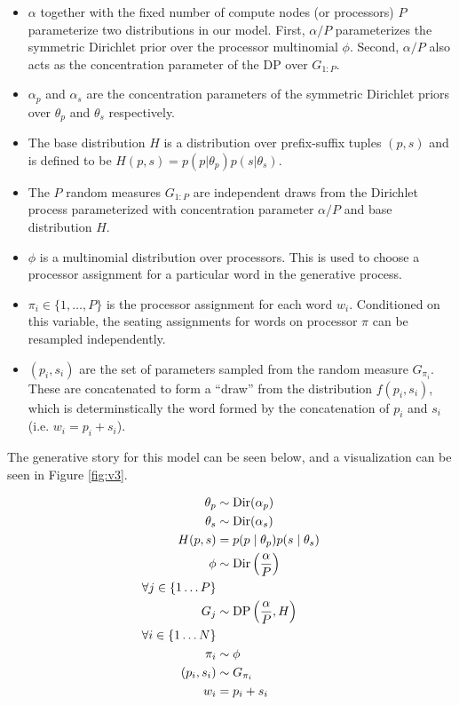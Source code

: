 \begin{itemize}

\item $\alpha$ together with the fixed number of compute nodes (or
  processors) $P$ parameterize two distributions in our model. First,
  $\alpha/P$ parameterizes the symmetric Dirichlet prior over the
  processor multinomial $\phi$. Second, $\alpha/P$ also acts as the
  concentration parameter of the DP over $G_{1:P}$.

\item $\alpha_p$ and $\alpha_s$ are the concentration parameters of
  the symmetric Dirichlet priors over $\theta_p$ and $\theta_s$
  respectively.

\item The base distribution $H$ is a distribution over prefix-suffix
  tuples $(p, s)$ and is defined to be $H(p, s) = p(p | \theta_p) p(s
  | \theta_s)$.

\item The $P$ random measures $G_{1:P}$ are independent draws from the
  Dirichlet process parameterized with concentration parameter
  $\alpha/P$ and base distribution $H$.

\item $\phi$ is a multinomial distribution over processors. This is
  used to choose a processor assignment for a particular word in the
  generative process.

\item $\pi_i \in \{1, \ldots, P\}$ is the processor assignment for
  each word $w_i$. Conditioned on this variable, the seating
  assignments for words on processor $\pi$ can be resampled
  independently.

\item $(p_i, s_i)$ are the set of parameters sampled from the random
  measure $G_{\pi_i}$. These are concatenated to form a ``draw'' from
  the distribution $f(p_i, s_i)$, which is determinstically the word
  formed by the concatenation of $p_i$ and $s_i$ (i.e. $w_i = p_i +
  s_i$).

\end{itemize}

The generative story for this model can be seen below, and a
visualization can be seen in Figure \ref{fig:v3}.

\begin{align*}
  \theta_p & \sim \mathrm{Dir}(\alpha_p) \\
  \theta_s & \sim \mathrm{Dir}(\alpha_s) \\
  H(p, s) & = p(p \mid \theta_p) p(s \mid \theta_s) \\
  \phi & \sim \mathrm{Dir}\left(\frac{\alpha}{P}\right) \\
  \forall j \in \{1 \dots P\} \\
  G_j & \sim \mathrm{DP}\left(\frac{\alpha}{P}, H\right)\\
  \forall i \in \{1 \dots N\} \\
  \pi_i & \sim \phi \\
  (p_i, s_i) & \sim G_{\pi_i} \\
  w_i & = p_i+s_i
\end{align*}

